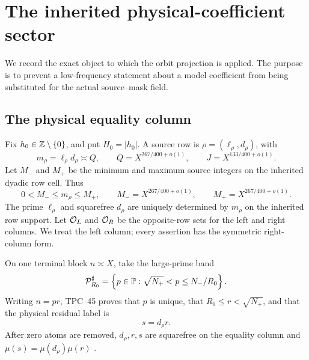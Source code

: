 \section{The inherited physical-coefficient sector}
\label{sec:tpc47-interface}

We record the exact object to which the orbit projection is applied.
The purpose is to prevent a low-frequency statement about a model
coefficient from being substituted for the actual source--mask field.

\subsection{The physical equality column}

Fix \(h_0\in\mathbb Z\setminus\{0\}\), and put \(H_0=|h_0|\).  A source row
is \(\rho=(\ell_\rho,d_\rho)\), with
\begin{equation}
 m_\rho=\ell_\rho d_\rho\asymp Q,
 \qquad
 Q=X^{267/400+o(1)},
 \qquad
 J=X^{133/400+o(1)}.
 \label{eq:tpc47-row-scales}
\end{equation}
Let \(M_-\) and \(M_+\) be the minimum and maximum source integers on
the inherited dyadic row cell.  Thus
\begin{equation}
 0<M_-\le m_\rho\le M_+,
 \qquad
 M_-=X^{267/400+o(1)},
 \qquad
 M_+=X^{267/400+o(1)}.
 \label{eq:tpc47-physical-M-bounds}
\end{equation}
The prime \(\ell_\rho\) and squarefree \(d_\rho\) are uniquely
determined by \(m_\rho\) on the inherited row support.  Let
\(\mathcal O_L\) and \(\mathcal O_R\) be the opposite-row sets for the left and
right columns.  We treat the left column; every assertion has the
symmetric right-column form.

On one terminal block \(n\asymp X\), take the large-prime band
\begin{equation}
 \mathcal P_{R_0}^{\sharp}
 =\left\{p\in\mathbb P:\sqrt{N_+}<p\le N_-/R_0\right\}.
 \label{eq:tpc47-large-prime-band}
\end{equation}
Writing \(n=pr\), TPC--45 proves that \(p\) is unique, that
\(R_0\le r<\sqrt{N_+}\), and that the physical residual label is
\begin{equation}
 s=d_\rho r.
 \label{eq:tpc47-residual-label}
\end{equation}
After zero atoms are removed, \(d_\rho,r,s\) are squarefree on the
equality column and \(\mu(s)=\mu(d_\rho)\mu(r)\)
\citep{WangTPC43,WangTPC45,WangTPC46}.

